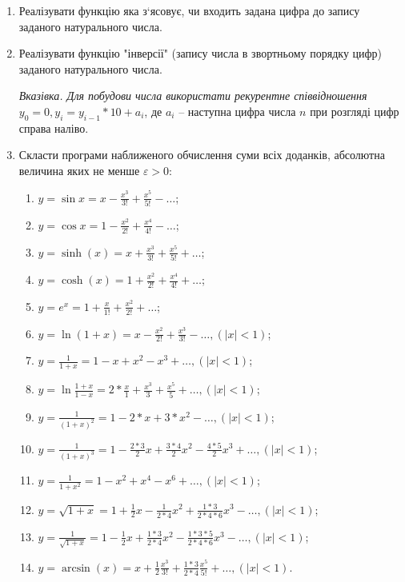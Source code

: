 \documentclass[a5paper,titlepage,openany,twoside,
]
{book_unv}%
\makeatletter
\newcommand{\xslalph}[1]{\expandafter\@xslalph\csname c@#1\endcsname}
\newcommand{\@xslalph}[1]{%
    \ifcase#1\or а\or б\or в\or г\or д\or e\or є\or ж\or з\or i%
    \or й\or к\or л\or м\or н\or о\or п\or р\or с\or т%
    \or у\or ф\or х\or ц\or ч\or ш\or ю\or я\or аа\or бб\or вв%
    \else\@ctrerr\fi%
}
\makeatother
\begin{document}
\begin{enumerate}
\begin{enumerate}[label=\xslalph*)]
\end{enumerate}

\item
  Реалізувати функцію яка з`ясовує, чи входить задана цифра до запису
  заданого натурального числа.
\item
  Реалізувати функцію "інверсії" (запису числа в звортньому порядку цифр)
  заданого натурального числа.

\emph{\emph{Вказівка. Для побудови числа використати рекурентне
співвідношення}} \(y_{0} = 0,y_{i} = y_{i - 1}*10 + a_{i}\), де
\(a_{i}\) -- наступна цифра числа \(n\) при розгляді цифр
справа наліво.

\item
  Скласти програми наближеного обчислення суми всіх доданків, абсолютна
  величина яких не менше $\varepsilon > 0 $:
\begin{enumerate}[label=\xslalph*)]
\item \(y = \sin x = x - \frac{x^{3}}{3!} + \frac{x^{5}}{5!} - \ldots\);
\item \(y = \cos x = 1 - \frac{x^{2}}{2!} + \frac{x^{4}}{4!} - \ldots\);
\item
\(y = \sinh (x) = x + \frac{x^{3}}{3!} + \frac{x^{5}}{5!} + \ldots\);
\item 
\(y = \cosh (x) = 1 + \frac{x^{2}}{2!} + \frac{x^{4}}{4!} + \ldots\);
\item \(y = e^{x} = 1 + \frac{x}{1!} + \frac{x^{2}}{2!} + \ldots\);
\item
\(y = \ln(1 + x) = x - \frac{x^{2}}{2!} + \frac{x^{3}}{3!} - \ldots,(\left| x \right| < 1)\);
\item
\(y = \frac{1}{1 + x} = 1 - x + x^{2} - x^{3} + \ldots,(\left| x \right| < 1)\);
\item
\(y = \ln\frac{1 + x}{1 - x} = 2*\frac{x}{1} + \frac{x^{3}}{3} + \frac{x^{5}}{5} + \ldots, (\left| x \right| < 1)\);
\item
\(y = \frac{1}{(1 + x)^{2}} = 1 - 2*x + 3*x^{2} - \ldots,(\left| x \right| < 1)\);
\item
\(y = \frac{1}{(1 + x)^{3}} = 1 - \frac{2*3}{2}x + \frac{3*4}{2}x^{2} - \frac{4*5}{2}x^{3} + \ldots,(\left| x \right| < 1)\);
\item
\(y = \frac{1}{1 + x^{2}} = 1 - x^{2} + x^{4} - x^{6} + \ldots,(\left| x \right| < 1)\);
\item
\(y = \sqrt{1 + x} = 1 + \frac{1}{2}x - \frac{1}{2*4}x^{2} + \frac{1*3}{2*4*6}x^{3} - \ldots,(\left| x \right| < 1)\);
\item
\(y = \frac{1}{\sqrt{1 + x}} = 1 - \frac{1}{2}x + \frac{1*3}{2*4}x^{2} - \frac{1*3*5}{2*4*6}x^{3} - \ldots,(\left| x \right| < 1)\);
\item
\(y = \arcsin (x) = x + \frac{1}{2}\frac{x^{3}}{3!} + \frac{1*3}{2*4}\frac{x^{5}}{5!} + \ldots,(\left| x \right| < 1)\).


\end{enumerate}
\end{enumerate}
\end{document}
